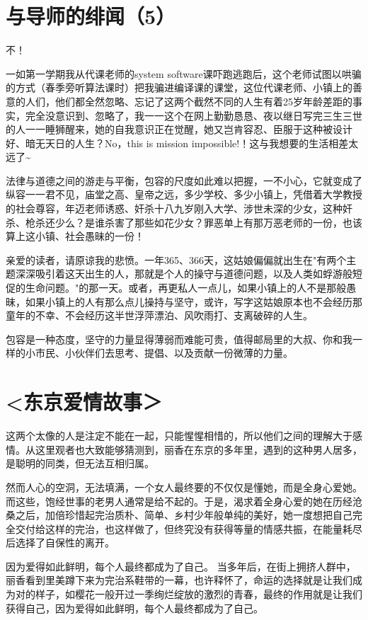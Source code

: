 \documentclass[12pt]{book}
\begin{document}
\section{与导师的绯闻（5）}
\label{sec-44-5}

不！

一如第一学期我从代课老师的system software课吓跑逃跑后，这个老师试图以哄骗的方式（春季旁听算法课时）把我骗进编译课的课堂，这位代课老师、小镇上的善意的人们，他们都全然忽略、忘记了这两个截然不同的人生有着25岁年龄差距的事实，完全没意识到、忽略了，我一一这个在网上勤勤恳恳、夜以继日写完三生三世的人一一睡狮醒来，她的自我意识正在觉醒，她又岂肯容忍、臣服于这种被设计好、暗无天日的人生？No，this is mission impossible!！这与我想要的生活相差太远了\textasciitilde{}~ 

法律与道德之间的游走与平衡，包容的尺度如此难以把握，一不小心，它就变成了纵容一一君不见，庙堂之高、皇帝之远，多少学校、多少小镇上，凭借着大学教授的社会尊容，年迈老师诱惑、奸杀十八九岁刚入大学、涉世未深的少女，这种奸杀、枪杀还少么？是谁杀害了那些如花少女？罪恶单上有那万恶老师的一份，也该算上这小镇、社会愚昧的一份！

亲爱的读者，请原谅我的悲愤。一年365、366天，这姑娘偏偏就出生在"有两个主题深深吸引着这天出生的人，那就是个人的操守与道德问题，以及人类如蜉游般短促的生命问题。"的那一天。或者，再更私人一点儿，如果小镇上的人不是那般愚昧，如果小镇上的人有那么点儿操持与坚守，或许，写字这姑娘原本也不会经历那童年的不幸、不会经历这半世浮萍漂泊、风吹雨打、支离破碎的人生。

包容是一种态度，坚守的力量显得薄弱而难能可贵，值得邮局里的大叔、你和我一样的小市民、小伙伴们去思考、提倡、以及贡献一份微薄的力量。

\section{<东京爱情故事＞}
\label{sec-44-6}

这两个太像的人是注定不能在一起，只能惺惺相惜的，所以他们之间的理解大于感情。从这里观者也大致能够猜测到，丽香在东京的多年里，遇到的这种男人居多，是聪明的同类，但无法互相归属。

然而人心的空洞，无法填满，一个女人最终要的不仅仅是懂她，而是全身心爱她。而这些，饱经世事的老男人通常是给不起的。于是，渴求着全身心爱的她在历经沧桑之后，加倍珍惜起完治质朴、简单、乡村少年般单纯的美好，她一度想把自己完全交付给这样的完治，也这样做了，但终究没有获得等量的情感共振，在能量耗尽后选择了自保性的离开。

因为爱得如此鲜明，每个人最终都成为了自己。
当多年后，在街上拥挤人群中，丽香看到里美蹲下来为完治系鞋带的一幕，也许释怀了，命运的选择就是让我们成为对的样子，如樱花一般开过一季绚烂绽放的激烈的青春，最终的作用就是让我们获得自己，因为爱得如此鲜明，每个人最终都成为了自己。
\end{document}

